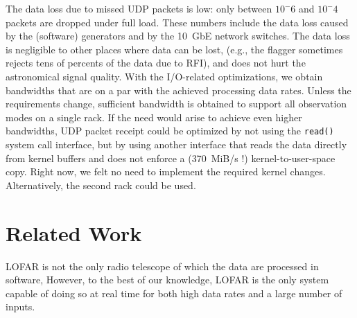 \documentclass[10pt]{article}
\begin{document}
The data loss due to missed UDP packets is low: only between $10^-6$ and
$10^-4$ packets are dropped under full load.
These numbers include the data loss caused by the (software) generators and by
the 10~GbE network switches.
The data loss is negligible to other places where data can be lost,
(e.g., the flagger sometimes rejects tens of percents of the data due to RFI),
and does not hurt the astronomical signal quality.
With the I/O-related optimizations, we obtain bandwidths that are on a par
with the achieved processing data rates.
Unless the requirements change, sufficient bandwidth is obtained to support
all observation modes on a single rack.
If the need would arise to achieve even higher bandwidths, UDP packet receipt
could be optimized by not using the \texttt{read()} system call interface,
but by using another interface that reads the data directly from kernel buffers
and does not enforce a (370~MiB/s !) kernel-to-user-space copy.
Right now, we felt no need to implement the required kernel changes.
Alternatively, the second rack could be used.


\section{Related Work}



LOFAR is not the only radio telescope of which the data are processed in software, However, to
the best of our knowledge, LOFAR is the only system capable of doing so at real time for both
high data rates and a large number of inputs.
\end{document}
